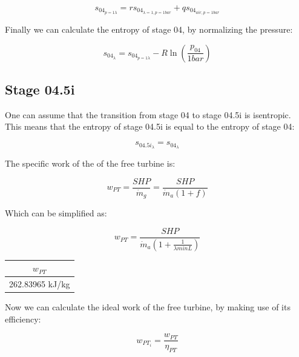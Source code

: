 \documentclass[titlepage]{article}
\begin{document}
    \begin{equation}
        s_{04_{p=1 \lambda}} = r s_{04_{\lambda=1, p=1 bar}} + q s_{04_{air, p=1 bar}}
    \end{equation}

    Finally we can calculate the entropy of stage 04, by normalizing the pressure:

    \begin{equation}
        s_{04_{\lambda}} = s_{04_{p=1 \lambda}} - R \ln \left( \frac{p_{04}}{1 bar} \right)
    \end{equation}

    \subsection{Stage 04.5i}

    One can assume that the transition from stage 04 to stage 04.5i is isentropic. This means that the entropy of stage 04.5i is equal to the entropy of stage 04:

    \begin{equation}
        s_{04.5i_{\lambda}} = s_{04_{\lambda}}
    \end{equation}

    The specific work of the of the free turbine is:

    \begin{equation}
        w_{PT} = \frac{SHP}{\dot{m}_{g}} = \frac{SHP}{\dot{m}_{a} (1 +f)}
    \end{equation}

    Which can be simplified as:

    \begin{equation}
        w_{PT} = \frac{SHP}{\dot{m}_{a} \left(1 + \frac{1}{\lambda minL}\right)}
    \end{equation}

    \begin{center}
        \begin{tabular}{|c|}
            \hline
            $w_{PT}$ \\
            \hline
            262.83965 kJ/kg \\
            \hline
        \end{tabular}
    \end{center}

    Now we can calculate the ideal work of the free turbine, by making use of its efficiency:

    \begin{equation}
        w_{PT_{i}} = \frac{w_{PT}}{\eta_{PT}}
    \end{equation}
\end{document}
